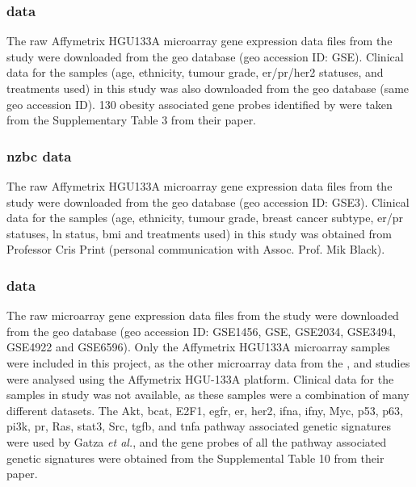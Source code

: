 \subsubsection{\citet{Fuentes-Mattei2014} data}
\label{ssub:fuentes-mattei2014_data}

The raw Affymetrix HGU\-133A microarray gene expression data files from the  \citet{Fuentes-Mattei2014} study were downloaded from the \gls{geo} database (\gls{geo} accession ID: GSE).
Clinical data for the samples (age, ethnicity, tumour grade, \gls{er}/\gls{pr}/\gls{her2} statuses, and treatments used) in this study was also downloaded from the \gls{geo} database (same \gls{geo} accession ID).
130 obesity associated gene probes identified by \citet{Fuentes-Mattei2014} were taken from the Supplementary Table 3 from their paper.

\subsubsection{\gls{nzbc} data}
\label{ssub:nzbc_data}

The raw Affymetrix HGU133A microarray gene expression data files from the \citet{Print2016} study were downloaded from the \gls{geo} database (\gls{geo} accession ID: GSE3).
Clinical data for the samples (age, ethnicity, tumour grade, breast cancer subtype, \gls{er}/\gls{pr} statuses, \gls{ln} status, \gls{bmi} and treatments used) in this study was obtained from Professor Cris Print (personal communication with Assoc. Prof. Mik Black).

\subsubsection{\citet{Gatza2010a} data}
\label{ssub:gatza2010a_data}

The raw microarray gene expression data files from the \citet{Gatza2010a} study were downloaded from the \gls{geo} database (\gls{geo} accession ID: GSE1456, GSE, GSE2034, GSE3494, GSE4922 and GSE6596).
Only the Affymetrix HGU\-133A microarray samples were included in this project, as the other microarray data from the \citet{Creighton2012}, \citet{Fuentes-Mattei2014} and \citet{Print2016} studies were analysed using the Affymetrix HGU-133A platform.
Clinical data for the samples in \citet{Gatza2010a} study was not available, as these samples were a combination of many different datasets.
The Akt, \gls{bcat}, E2F1, \gls{egfr}, \gls{er}, \gls{her2}, \gls{ifna}, \gls{ifny}, Myc, p53, p63, \gls{pi3k}, \gls{pr}, Ras, \gls{stat3}, Src, \gls{tgfb}, and \gls{tnfa} pathway associated genetic signatures were used by Gatza \textit{et al.}, and the gene probes of all the pathway associated genetic signatures were obtained from the Supplemental Table 10 from their paper.

